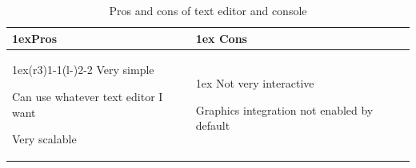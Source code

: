 \documentclass{article}
\begin{document}
    \begin{table}[H]
    \begin{tabularx}{\linewidth}{>{\parskip1ex}X@{\kern4\tabcolsep}>{\parskip1ex}X}
    \toprule
    \hfil\bfseries Pros
    &
    \hfil\bfseries Cons
    \\\cmidrule(r{3\tabcolsep}){1-1}\cmidrule(l{-\tabcolsep}){2-2}
    Very simple\par
    Can use whatever text editor I want\par
    Very scalable\par
    &
    Not very interactive\par
    Graphics integration not enabled by default\par
    \\\bottomrule
    \end{tabularx}
    \caption{Pros and cons of text editor and console}
    \end{table}
\end{document}
